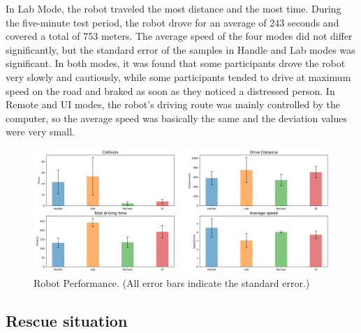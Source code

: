 In Lab Mode, the robot traveled the most distance and the most time. During the five-minute test period, the robot drove for an average of 243 seconds and covered a total of 753 meters. The average speed of the four modes did not differ significantly, but the standard error of the samples in Handle and Lab modes was significant.  In both modes, it was found that some participants drove the robot very slowly and cautiously, while some participants tended to drive at maximum speed on the road and braked as soon as they noticed a distressed person. In Remote and UI modes, the robot's driving route was mainly controlled by the computer, so the average speed was basically the same and the deviation values were very small.
\begin{figure}[htbp]
    \centering
    \includegraphics[width=\textwidth]{graphics/Robot Performance.png}
    \caption{Robot Performance. (All error bars indicate the standard error.)} 
    \label{fig:performance}
\end{figure}



\subsection{Rescue situation}


